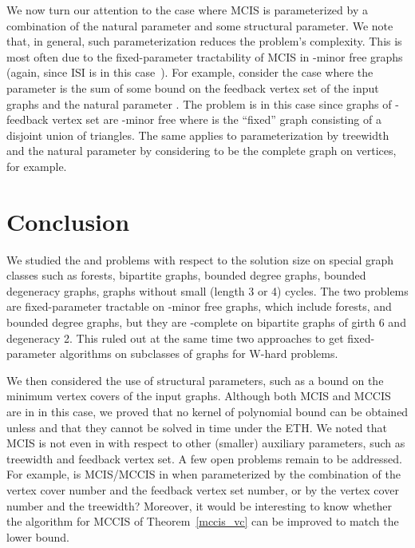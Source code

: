 We now turn our attention to the case where MCIS is parameterized by a 
combination of the natural parameter and some structural parameter. We note 
that, in general, such parameterization reduces the problem's complexity. This 
is most often due to the fixed-parameter tractability of MCIS in -minor 
free graphs (again, since ISI is  in this case~\cite{FG01}).
For example, consider the case where the parameter is the sum of some bound  
on the feedback vertex set of the input graphs and the natural parameter . 
The problem is  in this case since graphs of -feedback vertex set are 
-minor free where  is the ``fixed'' graph consisting of a disjoint union 
of  triangles. The same applies to parameterization by treewidth and the 
natural parameter by considering  to be the complete graph on  
vertices, for example.



\section{Conclusion}

We studied the \mcis and \mccis problems with respect to the solution size on special graph classes such as forests, bipartite graphs, bounded degree graphs, bounded degeneracy graphs, graphs without small (length 3 or 4) cycles. 
The two problems are fixed-parameter tractable on -minor free graphs, which include forests, and bounded degree graphs, but they are -complete on bipartite graphs of girth 6 and degeneracy 2.
This ruled out at the same time two approaches to get fixed-parameter algorithms on subclasses of graphs for W-hard problems.

We then considered the use of structural parameters, such as a bound on the minimum vertex covers of the input graphs. 
Although both MCIS and MCCIS are in  in this case, we proved that no kernel of polynomial bound can be obtained unless  and that they cannot be solved in time  under the ETH.
We noted that MCIS is not even in  with respect to other (smaller) auxiliary parameters, such as treewidth and feedback vertex set. A few open problems remain to be addressed. 
For example, is MCIS/MCCIS in  when parameterized by the combination of the vertex cover number and the feedback vertex set number, or by the vertex cover number and the treewidth?
Moreover, it would be interesting to know whether the algorithm for MCCIS of Theorem~\ref{mccis_vc} can be improved to match the lower bound.










